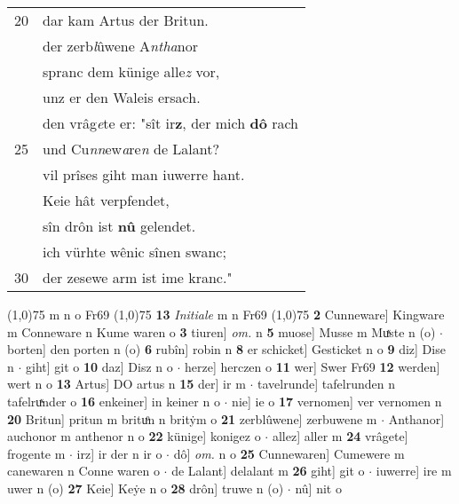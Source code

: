 \documentclass[8pt,a4paper,notitlepage]{article}
\begin{document}
\begin{table}[ht]
\begin{minipage}[t]{0.5\linewidth}
\begin{tabular}{rl}
20 & dar kam Artus der Britun.\\ 
 & der zerb\textit{l}ûwene A\textit{ntha}nor\\ 
 & spranc dem künige alle\textit{z} vor,\\ 
 & unz er den Waleis ersach.\\ 
 & den vrâg\textit{e}te er: "sît ir\textbf{z}, der mich \textbf{dô} rach\\ 
25 & und Cu\textit{nn}ew\textit{a}re\textit{n}  de Lalant?\\ 
 & vil prîses giht man iuwerre hant.\\ 
 & Keie hât verpfendet,\\ 
 & sîn drôn ist \textbf{nû} gelendet.\\ 
 & ich vürhte wênic sînen swanc;\\ 
30 & der zesewe arm ist ime kranc."\\ 
\end{tabular}
\scriptsize
\line(1,0){75} \newline
m n o Fr69 \newline
\line(1,0){75} \newline
\textbf{13} \textit{Initiale} m n Fr69  \newline
\line(1,0){75} \newline
\textbf{2} Cunneware] Kingware m Conneware n Kume waren o \textbf{3} tiuren] \textit{om.} n \textbf{5} muose] Musse m Muͯste n (o)  $\cdot$ borten] den porten n (o) \textbf{6} rubîn] robin n \textbf{8} er schicket] Gesticket n o \textbf{9} diz] Dise n  $\cdot$ giht] git o \textbf{10} daz] Disz n o  $\cdot$ herze] herczen o \textbf{11} wer] Swer Fr69 \textbf{12} werden] wert n o \textbf{13} Artus] DO artus n \textbf{15} der] ir m  $\cdot$ tavelrunde] tafelrunden n tafelruͯnder o \textbf{16} enkeiner] in keiner n o  $\cdot$ nie] ie o \textbf{17} vernomen] ver vernomen n \textbf{20} Britun] pritun m brituͦn n britẏm o \textbf{21} zerblûwene] zerbuwene m  $\cdot$ Anthanor] auchonor m anthenor n o \textbf{22} künige] konigez o  $\cdot$ allez] aller m \textbf{24} vrâgete] frogente m  $\cdot$ irz] ir der n ir o  $\cdot$ dô] \textit{om.} n o \textbf{25} Cunnewaren] Cumewere m canewaren n Conne waren o  $\cdot$ de Lalant] delalant m \textbf{26} giht] git o  $\cdot$ iuwerre] ire m uwer n (o) \textbf{27} Keie] Keẏe n o \textbf{28} drôn] truwe n (o)  $\cdot$ nû] nit o \newline
\end{minipage}
\end{table}
\newpage
\end{document}
